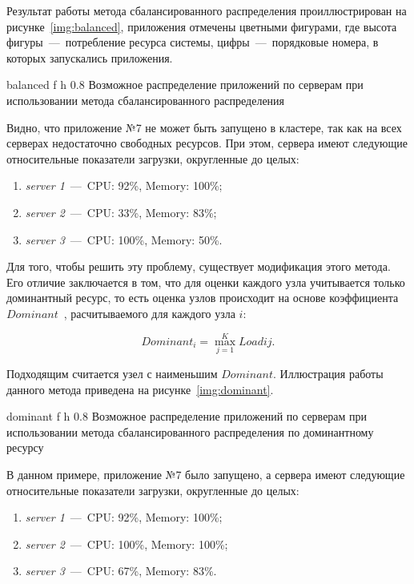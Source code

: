 Результат работы метода сбалансированного распределения проиллюстрирован на рисунке~\ref{img:balanced}, приложения отмечены цветными фигурами, где высота фигуры~---~потребление ресурса системы, цифры~---~порядковые номера, в которых запускались приложения.

\newpage

    {balanced}
    {f}
    {h}
    {0.8\textwidth}
    {Возможное распределение приложений по серверам при использовании метода сбалансированного распределения}
    
Видно, что приложение №7 не может быть запущено в кластере, так как на всех серверах недостаточно свободных ресурсов. При этом, сервера имеют следующие относительные показатели загрузки, округленные до целых:

\begin{enumerate}
	\item \textit{server 1}~---~CPU: 92\%, Memory: 100\%;
	\item \textit{server 2}~---~CPU: 33\%, Memory: 83\%;
	\item \textit{server 3}~---~CPU: 100\%, Memory: 50\%.
\end{enumerate}

Для того, чтобы решить эту проблему, существует модификация этого метода. Его отличие заключается в том, что для оценки каждого узла учитывается только доминантный ресурс, то есть оценка узлов происходит на основе коэффициента $Dominant$~\cite{wang2014dominant}, расчитываемого для каждого узла $i$:

\begin{equation}
	Dominant_{i} = \max_{j = 1}^{K} Load{ij}.
\end{equation}

Подходящим считается узел с наименьшим $Dominant$. Иллюстрация работы данного метода приведена на рисунке~\ref{img:dominant}.

    {dominant}
    {f}
    {h}
    {0.8\textwidth}
    {Возможное распределение приложений по серверам при использовании метода сбалансированного распределения по доминантному ресурсу}
    
В данном примере, приложение №7 было запущено, а сервера имеют следующие относительные показатели загрузки, округленные до целых:

\begin{enumerate}
	\item \textit{server 1}~---~CPU: 92\%, Memory: 100\%;
	\item \textit{server 2}~---~CPU: 100\%, Memory: 100\%;
	\item \textit{server 3}~---~CPU: 67\%, Memory: 83\%.
\end{enumerate}

